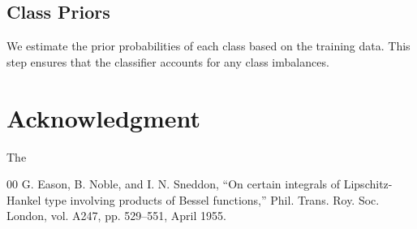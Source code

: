 \documentclass[conference]{IEEEtran}
\begin{document}
\subsection{Class Priors}\label{CP}
We estimate the prior probabilities of each class based on the training data. This step ensures that the classifier accounts for any class imbalances.

\section*{Acknowledgment}

The 


\begin{thebibliography}{00}
 G. Eason, B. Noble, and I. N. Sneddon, ``On certain integrals of Lipschitz-Hankel type involving products of Bessel functions,'' Phil. Trans. Roy. Soc. London, vol. A247, pp. 529--551, April 1955.

\end{thebibliography}
\end{document}
